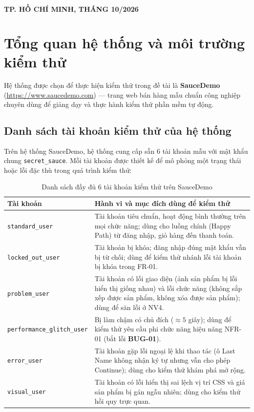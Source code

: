 \documentclass[a4paper]{article}
\begin{document}
\begin{titlepage}
\begin{center}
  \textbf{TP. HỒ CHÍ MINH, THÁNG 10/2026}
\end{center}
\end{titlepage}

\tableofcontents
\newpage

\section{Tổng quan hệ thống và môi trường kiểm thử}
Hệ thống được chọn để thực hiện kiểm thử trong đề tài là \textbf{SauceDemo} (\url{https://www.saucedemo.com}) --- trang web bán hàng mẫu chuẩn công nghiệp chuyên dùng để giảng dạy và thực hành kiểm thử phần mềm tự động.

\subsection{Danh sách tài khoản kiểm thử của hệ thống}
Trên hệ thống SauceDemo, hệ thống cung cấp sẵn 6 tài khoản mẫu với mật khẩu chung \texttt{secret\_sauce}. Mỗi tài khoản được thiết kế để mô phỏng một trạng thái hoặc lỗi đặc thù trong quá trình kiểm thử:
\begin{table}[H]
\centering
\small
\begin{tabularx}{\textwidth}{|l|X|}
\hline
\textbf{Tài khoản} & \textbf{Hành vi và mục đích dùng để kiểm thử} \\ \hline
\texttt{standard\_user} & Tài khoản tiêu chuẩn, hoạt động bình thường trên mọi chức năng; dùng cho luồng chính (Happy Path) từ đăng nhập, giỏ hàng đến thanh toán. \\ \hline
\texttt{locked\_out\_user} & Tài khoản bị khóa; đăng nhập đúng mật khẩu vẫn bị từ chối; dùng để kiểm thử nhánh lỗi tài khoản bị khóa trong FR-01. \\ \hline
\texttt{problem\_user} & Tài khoản có lỗi giao diện (ảnh sản phẩm bị lỗi hiển thị giống nhau) và lỗi chức năng (không sắp xếp được sản phẩm, không xóa được sản phẩm); dùng để săn lỗi ở NV4. \\ \hline
\texttt{performance\_glitch\_user} & Bị làm chậm có chủ đích ($\approx 5$ giây); dùng để kiểm thử yêu cầu phi chức năng hiệu năng NFR-01 (bắt lỗi \textbf{BUG-01}). \\ \hline
\texttt{error\_user} & Tài khoản gặp lỗi ngoại lệ khi thao tác (ô Last Name không nhận ký tự nhưng vẫn cho phép Continue); dùng cho kiểm thử khám phá mở rộng. \\ \hline
\texttt{visual\_user} & Tài khoản có lỗi hiển thị sai lệch vị trí CSS và giá sản phẩm bị gán ngẫu nhiên; dùng cho kiểm thử hồi quy trực quan. \\ \hline
\end{tabularx}
\caption{Danh sách đầy đủ 6 tài khoản kiểm thử trên SauceDemo}
\end{table}
\end{document}
